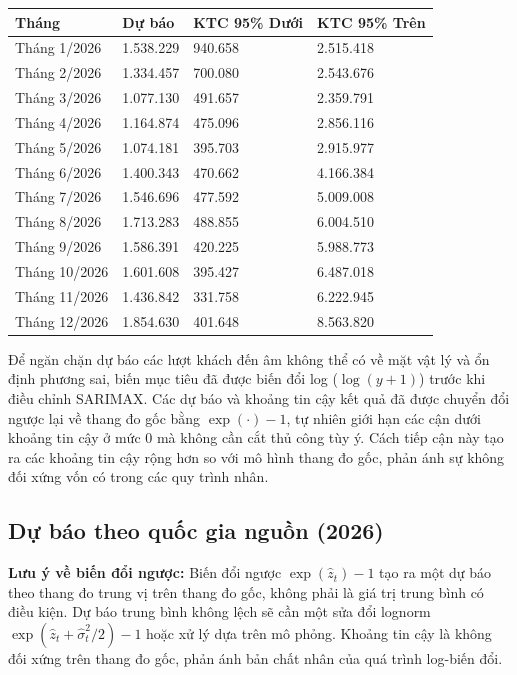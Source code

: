 \documentclass[
]{article}
\begin{document}
\begin{longtable}[]{@{}llll@{}}
\toprule\noalign{}
Tháng & Dự báo & KTC 95\% Dưới & KTC 95\% Trên \\
\midrule\noalign{}
\endhead
\bottomrule\noalign{}
\endlastfoot
Tháng 1/2026 & 1.538.229 & 940.658 & 2.515.418 \\
Tháng 2/2026 & 1.334.457 & 700.080 & 2.543.676 \\
Tháng 3/2026 & 1.077.130 & 491.657 & 2.359.791 \\
Tháng 4/2026 & 1.164.874 & 475.096 & 2.856.116 \\
Tháng 5/2026 & 1.074.181 & 395.703 & 2.915.977 \\
Tháng 6/2026 & 1.400.343 & 470.662 & 4.166.384 \\
Tháng 7/2026 & 1.546.696 & 477.592 & 5.009.008 \\
Tháng 8/2026 & 1.713.283 & 488.855 & 6.004.510 \\
Tháng 9/2026 & 1.586.391 & 420.225 & 5.988.773 \\
Tháng 10/2026 & 1.601.608 & 395.427 & 6.487.018 \\
Tháng 11/2026 & 1.436.842 & 331.758 & 6.222.945 \\
Tháng 12/2026 & 1.854.630 & 401.648 & 8.563.820 \\
\end{longtable}

Để ngăn chặn dự báo các lượt khách đến âm không thể có về mặt vật lý và
ổn định phương sai, biến mục tiêu đã được biến đổi log (\(\log(y+1)\))
trước khi điều chỉnh SARIMAX. Các dự báo và khoảng tin cậy kết quả đã
được chuyển đổi ngược lại về thang đo gốc bằng \(\exp(\cdot) - 1\), tự
nhiên giới hạn các cận dưới khoảng tin cậy ở mức 0 mà không cần cắt thủ
công tùy ý. Cách tiếp cận này tạo ra các khoảng tin cậy rộng hơn so với
mô hình thang đo gốc, phản ánh sự không đối xứng vốn có trong các quy
trình nhân.

\subsection{Dự báo theo quốc gia nguồn
(2026)}\label{dux1ef1-buxe1o-theo-quux1ed1c-gia-nguux1ed3n-2026}

\textbf{Lưu ý về biến đổi ngược:} Biến đổi ngược \(\exp(\hat{z}_t) - 1\)
tạo ra một dự báo theo thang đo trung vị trên thang đo gốc, không phải
là giá trị trung bình có điều kiện. Dự báo trung bình không lệch sẽ cần
một sửa đổi lognorm \(\exp(\hat{z}_t + \hat{\sigma}^2_t/2) - 1\) hoặc xử
lý dựa trên mô phỏng. Khoảng tin cậy là không đối xứng trên thang đo
gốc, phản ánh bản chất nhân của quá trình log-biến đổi.
\end{document}
